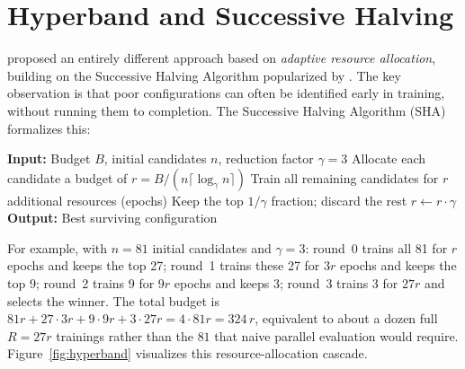 \documentclass[11pt,a4paper]{report}
\begin{document}
\section{Hyperband and Successive Halving}
\label{sec:hyperband}

\citet{li2018hyperband} proposed an entirely different approach based on \emph{adaptive resource allocation}, building on the Successive Halving Algorithm popularized by \citet{jamieson2016nonstochastic}.  The key observation is that poor configurations can often be identified early in training, without running them to completion.  The Successive Halving Algorithm (SHA) formalizes this:

\begin{definitionbox}
\begin{algorithmic}
\small
\STATE \textbf{Input:} Budget $B$, initial candidates $n$, reduction factor $\gamma = 3$
\STATE Allocate each candidate a budget of $r = B/(n \lceil\log_\gamma n\rceil)$
    \STATE Train all remaining candidates for $r$ additional resources (epochs)
    \STATE Keep the top $1/\gamma$ fraction; discard the rest
    \STATE $r \leftarrow r \cdot \gamma$
\ENDFOR
\STATE \textbf{Output:} Best surviving configuration
\end{algorithmic}
\end{definitionbox}

For example, with $n = 81$ initial candidates and $\gamma = 3$: round~0 trains all 81 for $r$ epochs and keeps the top 27; round~1 trains these 27 for $3r$ epochs and keeps the top 9; round~2 trains 9 for $9r$ epochs and keeps 3; round~3 trains 3 for $27r$ and selects the winner.  The total budget is $81r + 27\cdot 3r + 9\cdot 9r + 3\cdot 27r = 4 \cdot 81 r = 324\,r$, equivalent to about a dozen full $R = 27r$ trainings rather than the $81$ that naive parallel evaluation would require.  Figure~\ref{fig:hyperband} visualizes this resource-allocation cascade.
\end{document}
